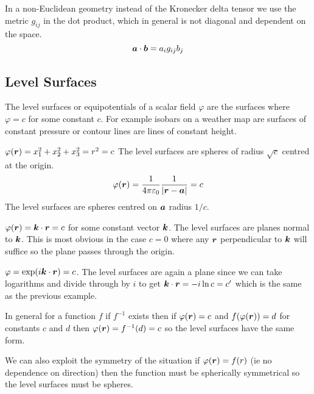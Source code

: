 \documentclass{article}
\begin{document}
    In a non-Euclidean geometry instead of the Kronecker delta tensor we use the metric \(g_{ij}\) in the dot product, which in general is not diagonal and dependent on the space.
    \[\bm{a}\cdot \bm{b} = a_ig_{ij}b_j\]
    
    \subsection{Level Surfaces}
    The level surfaces or equipotentials of a scalar field \(\varphi\) are the surfaces where \(\varphi = c\) for some constant \(c\).
    For example isobars on a weather map are surfaces of constant pressure or contour lines are lines of constant height.
    
    \example
    \(\varphi(\bm{r}) = x_1^2 + x_2^2 + x_3^2 = r^2 = c\) The level surfaces are spheres of radius \(\sqrt{c}\) centred at the origin.
    \[\varphi(\bm{r}) = \frac{1}{4\pi\varepsilon_0}\frac{1}{|\bm{r} - \bm{a}|} = c\]
    The level surfaces are spheres centred on \(\bm{a}\) radius \(1 / c\).
    
    \(\varphi(\bm{r}) = \bm{k}\cdot\bm{r} = c\) for some constant vector \(\bm{k}\).
    The level surfaces are planes normal to \(\bm{k}\).
    This is most obvious in the case \(c = 0\) where any \(\bm{r}\) perpendicular to \(\bm{k}\) will suffice so the plane passes through the origin.
    
    \(\varphi = \exp(i\bm{k}\cdot\bm{r}) = c\). 
    The level surfaces are again a plane since we can take logarithms and divide through by \(i\) to get \(\bm{k}\cdot\bm{r} = -i\ln c = c'\) which is the same as the previous example.
    
    In general for a function \(f\) if \(f^{-1}\) exists then if \(\varphi(\bm{r}) = c\) and \(f(\varphi(\bm{r})) = d\) for constants \(c\) and \(d\) then \(\varphi(\bm{r}) = f^{-1}(d) = c\) so the level surfaces have the same form.
    
    We can also exploit the symmetry of the situation if \(\varphi(\bm{r}) = f(r)\) (ie no dependence on direction) then the function must be spherically symmetrical so the level surfaces must be spheres.
    
\end{document}
